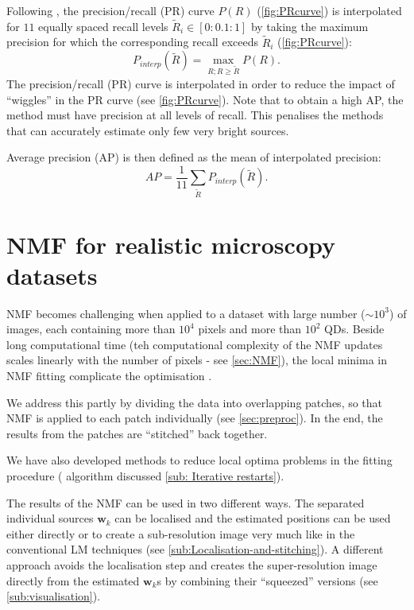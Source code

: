 Following \cite{Everingham2009}, the precision/recall (PR) curve $P(R)$ (\autoref{fig:PRcurve}\aaa) is interpolated for $11$ equally spaced recall levels $\tilde{R}_i\in[0:0.1:1]$ by taking the maximum precision for which the corresponding recall exceeds $\tilde{R}_i$ (\autoref{fig:PRcurve}\bbb):
%
\begin{equation}
	P_{interp}(\tilde{R})=\max_{R;R\geq \tilde{R}}P(R).
\end{equation}
%
The precision/recall (PR) curve is interpolated in order to reduce the impact of ``wiggles'' in the PR curve (see \autoref{fig:PRcurve}\bbb). Note that to obtain a high AP, the method must have precision at all levels of recall. This penalises the methods that can accurately estimate only few very bright sources. 

Average precision (AP) is then defined as the mean of interpolated precision:
%
\begin{equation}
	AP=\frac{1}{11}\sum_{\tilde{R}}{P_{interp}(\tilde{R})}.
	\label{eq:AP}
\end{equation}
\afterpage{\clearpage}

\section{NMF for realistic microscopy datasets \label{sec:NMF-for-real}}

NMF becomes challenging when applied to a dataset with large number ($\sim 10^3$) of images, each containing more than $10^4$ pixels and more than $10^2$ QDs. Beside long computational time (teh computational complexity of the NMF updates scales linearly with the number of pixels - see \autoref{sec:NMF}), the local minima in NMF fitting complicate the optimisation \cite{Kim2008}. 

We address this partly by dividing the data into overlapping patches, so that NMF is applied to each patch individually (see \autoref{sec:preproc}).  In the end, the results from the patches are ``stitched'' back together. 

We have also developed methods to reduce local optima problems in the fitting procedure (\inmf{} algorithm discussed \autoref{sub: Iterative restarts}). 

The results of the NMF can be used in two different ways. The separated individual sources $\bm{w}_k$ can be localised and the estimated positions can be used either directly or to create a sub-resolution image very much like in the conventional LM techniques (see \autoref{sub:Localisation-and-stitching}). A different approach avoids the localisation step and creates the super-resolution image directly from the estimated $\bm{w}_k$s by combining their ``squeezed'' versions (see \autoref{sub:visualisation}). 

